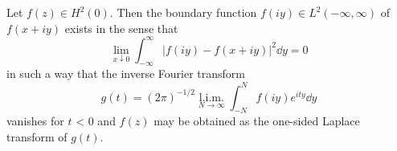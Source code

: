 \begin{theorem}\label{thm:VI.4.Theorem.2} Let $f(z) \in H^2(0)$. Then the boundary function $f(iy) \in L^2(-\infty, \infty)$ of $f(x + iy)$ exists in the sense that 
\begin{equation}\label{eq:VI.4.8}
\lim\limits _{x \downarrow 0} \int_{- \infty} ^{\infty} | f (i y) - f (x + i y) | ^{2} \dd y = 0
\end{equation}
in such a way that the inverse Fourier transform 
\begin{equation}\label{eq:VI.4.9}
g (t) = (2 \pi) ^{-1/2} \underset {N \rightarrow \infty} {\text{ l.i.m. }} \int_{-N} ^{N} f (i y) e ^{ity} \dd y
\end{equation}
vanishes for $t$ < $0$ and $f(z)$ may be obtained as the one-sided Laplace transform of $g(t)$. 
\end{theorem}

